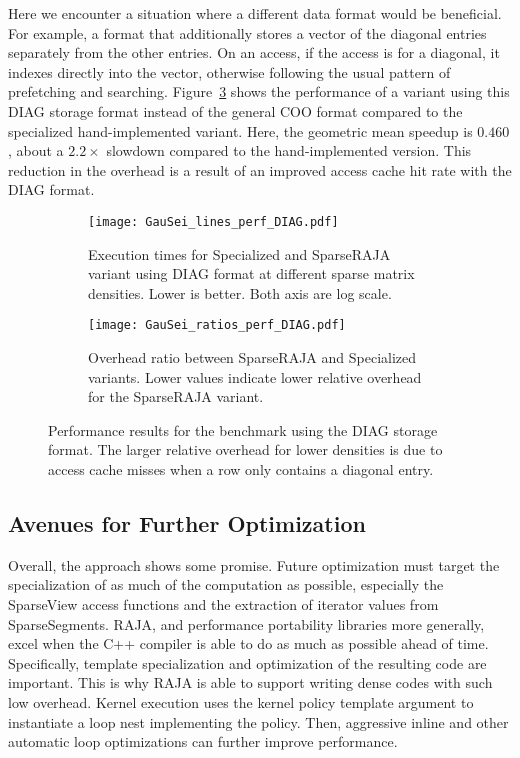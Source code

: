 Here we encounter a situation where a different data format would be beneficial.
For example, a format that additionally stores a vector of the diagonal entries separately from the other entries.
On an access, if the access is for a diagonal, it indexes directly into the vector, otherwise following the usual pattern of prefetching and searching.
Figure~\ref{GauSeiPerfDIAG} shows the performance of a variant using this DIAG storage format instead of the general COO format compared to the specialized hand-implemented variant.
Here, the geometric mean speedup is $0.460$, about a $2.2\times$ slowdown compared to the hand-implemented version.
This reduction in the overhead is a result of an improved access cache hit rate with the DIAG format.

\begin{figure}
  \begin{subfigure}{0.49\columnwidth}
    \texttt{[image: GauSei\_lines\_perf\_DIAG.pdf]}
    \caption{Execution times for Specialized and SparseRAJA variant using DIAG format at different sparse matrix densities. Lower is better. Both axis are log scale.}\label{GauSeiExecTimeDIAG}
  \end{subfigure}
  \hspace{0.02\columnwidth}
  \begin{subfigure}{0.49\columnwidth}
    \texttt{[image: GauSei\_ratios\_perf\_DIAG.pdf]}
    \caption{Overhead ratio between SparseRAJA and Specialized variants. Lower values indicate lower relative overhead for the SparseRAJA variant.}\label{GauSeiRatioDIAG}
  \end{subfigure}
  \caption{Performance results for the \GauSei{} benchmark using the DIAG storage format. The larger relative overhead for lower densities is due to access cache misses when a row only contains a diagonal entry.}\label{GauSeiPerfDIAG}
\end{figure}


\subsection{Avenues for Further Optimization}

Overall, the approach shows some promise.
Future optimization must target the specialization of as much of the computation as possible, especially the SparseView access functions and the extraction of iterator values from SparseSegments.
RAJA, and performance portability libraries more generally, excel when the C++ compiler is able to do as much as possible ahead of time.
Specifically, template specialization and optimization of the resulting code are important.
This is why RAJA is able to support writing dense codes with such low overhead.
Kernel execution uses the kernel policy template argument to instantiate a loop nest implementing the policy.
Then, aggressive inline and other automatic loop optimizations can further improve performance.

